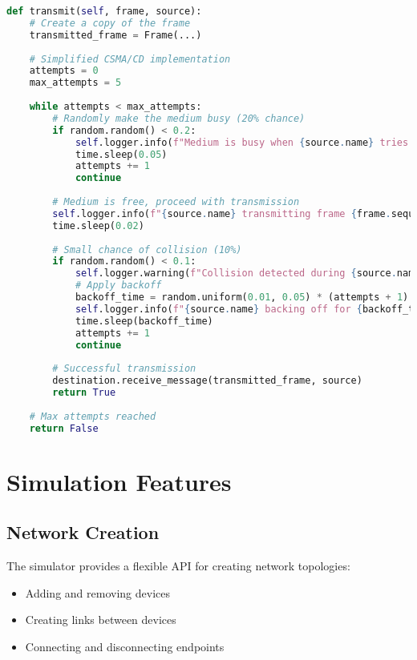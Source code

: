 \documentclass[12pt,a4paper]{article}
\begin{document}
\begin{lstlisting}[language=Python, caption=Simplified CSMA/CD Implementation]
def transmit(self, frame, source):
    # Create a copy of the frame
    transmitted_frame = Frame(...)
    
    # Simplified CSMA/CD implementation
    attempts = 0
    max_attempts = 5
    
    while attempts < max_attempts:
        # Randomly make the medium busy (20% chance)
        if random.random() < 0.2:
            self.logger.info(f"Medium is busy when {source.name} tries to send frame {frame.sequence_number}")
            time.sleep(0.05)
            attempts += 1
            continue
        
        # Medium is free, proceed with transmission
        self.logger.info(f"{source.name} transmitting frame {frame.sequence_number} to {destination.name}")
        time.sleep(0.02)
        
        # Small chance of collision (10%)
        if random.random() < 0.1:
            self.logger.warning(f"Collision detected during {source.name}'s transmission")
            # Apply backoff
            backoff_time = random.uniform(0.01, 0.05) * (attempts + 1)
            self.logger.info(f"{source.name} backing off for {backoff_time:.3f}s after collision")
            time.sleep(backoff_time)
            attempts += 1
            continue
        
        # Successful transmission
        destination.receive_message(transmitted_frame, source)
        return True
    
    # Max attempts reached
    return False
\end{lstlisting}

\section{Simulation Features}
\subsection{Network Creation}
The simulator provides a flexible API for creating network topologies:
\begin{itemize}
    \item Adding and removing devices
    \item Creating links between devices
    \item Connecting and disconnecting endpoints
\end{itemize}
\end{document}

